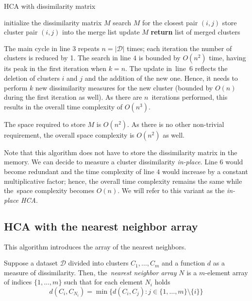 \begin{algorithm}[t]
	\caption{HCA with dissimilarity matrix}
	\label{alg01:dismat}
	\begin{algorithmic}[1]
		\State initialize the dissimilarity matrix $M$
		\State search $M$ for the closest pair $(i,j)$ 
		\State store cluster pair $(i,j)$ into the merge list 
		\State update $M$ 
		\EndFor
		\State \textbf{return} list of merged clusters
		\EndProcedure
	\end{algorithmic}
\end{algorithm}

The main cycle in line $3$ repeats $n = |\mathcal{D}|$ times; each iteration the number of clusters is reduced by 1. The search in line $4$ is bounded by $O(n^2)$ time, having its peak in the first iteration when $k=n$. The update in~line~$6$ reflects the deletion of clusters $i$ and $j$ and the addition of the new one. Hence, it needs to perform $k$ new dissimilarity measures for the new cluster (bounded by $O(n)$ during the first iteration as well). As there are $n$~iterations performed, this results in the overall time complexity of $O(n^3)$. 

The space required to store $M$ is $O(n^2)$. As there is no other non-trivial requirement, the overall space complexity is $O(n^2)$ as well. 
\begin{rem}
	Note that this algorithm does not have to store the dissimilarity matrix in the memory. We can decide to measure a cluster dissimilarity \emph{in-place}. Line $6$ would become redundant and the time complexity of line $4$ would increase by a constant multiplicative factor; hence, the overall time complexity remains the same while the~space complexity becomes $O(n)$. We will refer to this variant as the \emph{in-place HCA}.
\end{rem}


\subsection{HCA with the nearest neighbor array}
This algorithm introduces the array of the nearest neighbors.

\begin{defn}
	Suppose a dataset $\mathcal{D}$ divided into clusters $C_1,\dots,C_m$ and a function $d$ as a measure of dissimilarity. Then, the~\emph{nearest neighbor array} $N$ is a $m$-element array of indices $\{1,\dots,m\}$ such that for each element $N_i$ holds
	$$d(C_i,C_{N_i}) = \min\{d(C_i,C_j) : j \in \{1,\dots,m\} \setminus \{i\}\}$$
	\label{def01:neigh}
\end{defn}

